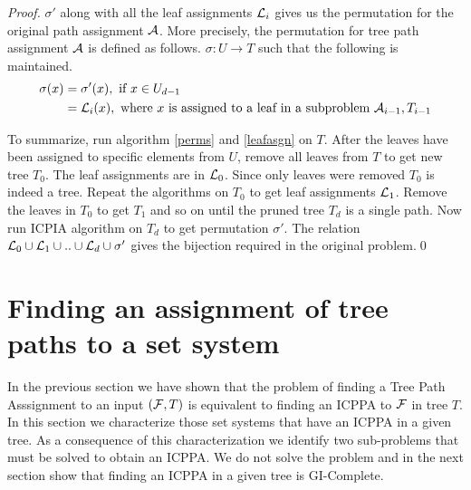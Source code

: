 \documentclass{llncs}
\def\cA{{\cal A}}
\def\cF{{\cal F}}
\def\cL{{\cal L}}
\begin{document}
\begin{proof}
\noindent
$\sigma'$ along with all the leaf assignments $\cL_i$
gives us the permutation for the original path assignment $\cA$.
More precisely, the permutation for tree path assignment $\cA$ is defined as
follows. $\sigma: U \rightarrow T$ such that the following
is maintained.
\begin{align*}
 \sigma(x) &= \sigma'(x),   \text{ if } x \in U_{d-1} \\
           &= \cL_i(x),     \text{ where $x$ is assigned to a leaf in a
             subproblem $\cA_{i-1}, T_{i-1}$}
\end{align*}

\noindent
To summarize, run algorithm \ref{perms} and
\ref{leafasgn} on $T$. After the leaves have been assigned to specific
elements from $U$, remove all leaves from $T$ to get new tree
$T_0$. The leaf assignments are in $\cL_0$. Since only leaves were removed $T_0$ is indeed a tree. Repeat
the algorithms on $T_0$ to get leaf assignments $\cL_{1}$. Remove the
leaves in $T_0$ to get $T_1$ and so on until the pruned tree $T_d$
is a single path. Now run ICPIA algorithm on $T_d$ to get
permutation $\sigma'$. The relation $\cL_0 \cup \cL_1 \cup .. \cup
\cL_{d} \cup \sigma'$ gives the bijection required in the original problem.\qed
\end{proof}

\section{Finding an assignment of tree paths to a set system} \label{decompos}
In the previous section we have shown that the problem of finding a Tree Path Asssignment to an input $(\cF,T)$ is equivalent to finding an ICPPA to $\cF$ in tree $T$.  
In this section we characterize those set systems that have an ICPPA in a given tree.  As a consequence of this characterization we identify two sub-problems that must be solved to obtain an ICPPA.  We do not solve the problem and in the next section show that finding an ICPPA in a given tree is GI-Complete.  
\end{document}

